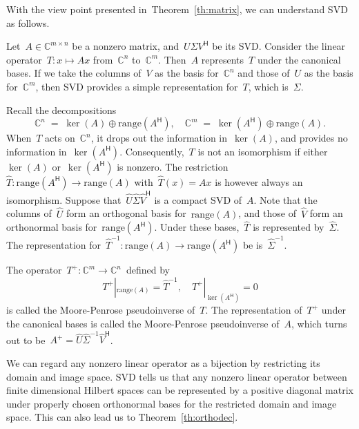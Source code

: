 \documentclass[11pt,a4paper]{article}  %
\numberwithin{equation}{section}
\theoremstyle{definition}
\def\CC{\mathbb{C}}
\newcommand{\hmt}{{\scriptscriptstyle{{\mathsf{H}}}}}
\newcommand{\pin}{{\scriptscriptstyle{{\mathsf{+}}}}}
\newcommand{\inv}{{-1}}
\newcommand{\range}{\mathrm{range}}
\begin{document}
With the view point presented in~Theorem~\ref{th:matrix}, we can understand SVD as follows.

Let~$A\in \CC^{m\times n}$ be a nonzero matrix, and~$U\Sigma V^\hmt$ be its SVD.
Consider the linear operator~$T \mathrel{:} x \mapsto A x$ from~$\CC^{n}$ to~$\CC^{m}$.
Then~$A$ represents~$T$ under the canonical bases. If we take the columns of~$V$ as the basis
for~$\CC^{n}$ and those of~$U$ as the basis for~$\CC^{m}$, then SVD provides a simple
representation for~$T$, which is~$\Sigma$.


Recall the decompositions
\begin{equation*}
\CC^{n} \;=\; \ker(A) \oplus \range(A^\hmt),
\quad
\CC^{m} \;=\; \ker(A^\hmt) \oplus \range(A).
\end{equation*}
When~$T$ acts on~$\CC^{n}$, it drops out the information in~$\ker(A)$, and provides no information
in~$\ker(A^\hmt)$.  Consequently,~$T$ is not an isomorphism if either~$\ker(A)$ or~$\ker(A^\hmt)$
is nonzero.
The restriction~$\hat{T} \mathrel{:} \range(A^\hmt)\to\range(A)$ with~$\hat{T} (x) =Ax$ is however
always an isomorphism.
Suppose that~$\hat{U}\hat{\Sigma} \hat{V}^\hmt$ is a compact SVD of~$A$.
Note that the columns of~$\hat{U}$ form an orthogonal basis
for~$\range(A)$, and those of~$\hat{V}$ form an orthonormal basis for~$\range(A^\hmt)$.
Under these bases,~$\hat{T}$ is represented by~$\hat{\Sigma}$.
The representation for~$\hat{T}^\inv\mathrel{:} \range(A)\to \range(A^\hmt)$ be
is~$\hat{\Sigma}^\inv$.

The operator~$T^\pin \mathrel{:} \CC^{m}\to \CC^{n}$~defined by%
\[
T^\pin|_{\range(A)} = \hat{T}^\inv, \quad
T^\pin|_{\ker(A^\hmt)} = 0
\]
is called the Moore-Penrose pseudoinverse of~$T$.
The representation
of~$T^\pin$ under the canonical bases is called the Moore-Penrose pseudoinverse of~$A$, which turns
out to be~$A^\pin = \hat{U}\hat{\Sigma}^\inv\hat{V}^\hmt$.

We can regard any nonzero linear operator as a bijection by restricting its domain and image
space.
SVD tells us that any nonzero linear operator between finite dimensional Hilbert spaces
can be represented by a positive diagonal matrix under properly chosen orthonormal bases for the
restricted domain and image space. This can also lead us to Theorem~\ref{th:orthodec}.
\end{document}
